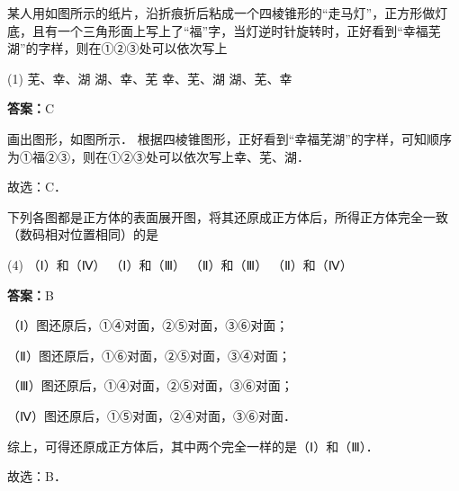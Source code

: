 \vspace{2em}

\begin{example}[\bkstar{2}{5}]
某人用如图所示的纸片，沿折痕折后粘成一个四棱锥形的“走马灯”，正方形做灯底，且有一个三角形面上写上了“福”字，当灯逆时针旋转时，正好看到“幸福芜湖”的字样，则在①②③处可以依次写上
\begin{tasks}(1)
    \task 芜、幸、湖
    \task 湖、幸、芜
    \task 幸、芜、湖
    \task 湖、芜、幸
\end{tasks}
\end{example}
\begin{solution}
\textbf{答案：}C

画出图形，如图所示．
根据四棱锥图形，正好看到“幸福芜湖”的字样，可知顺序为①福②③，则在①②③处可以依次写上幸、芜、湖．

故选：C．
\end{solution}

\vspace{2em}

\begin{example}[\bkstar{2}{5}]
下列各图都是正方体的表面展开图，将其还原成正方体后，所得正方体完全一致（数码相对位置相同）的是
\begin{tasks}(4)
    \task （Ⅰ）和（Ⅳ）
    \task （Ⅰ）和（Ⅲ）
    \task （Ⅱ）和（Ⅲ）
    \task （Ⅱ）和（Ⅳ）
\end{tasks}
\end{example}
\begin{solution}
\textbf{答案：}B

（Ⅰ）图还原后，①④对面，②⑤对面，③⑥对面；

（Ⅱ）图还原后，①⑥对面，②⑤对面，③④对面；

（Ⅲ）图还原后，①④对面，②⑤对面，③⑥对面；

（Ⅳ）图还原后，①⑤对面，②④对面，③⑥对面．

综上，可得还原成正方体后，其中两个完全一样的是（Ⅰ）和（Ⅲ）．

故选：B．
\end{solution}

\vspace{2em}

